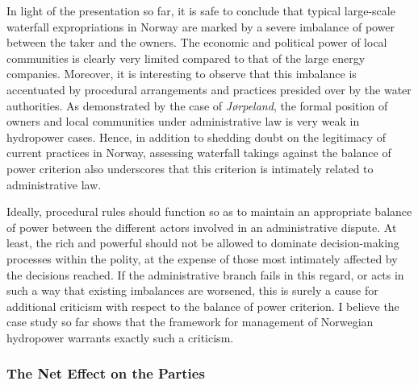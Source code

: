 
In light of the presentation so far, it is safe to conclude that typical large-scale waterfall expropriations in Norway are marked by a severe imbalance of power between the taker and the owners. The economic and political power of local communities is clearly very limited compared to that of the large energy companies. Moreover, it is interesting to observe that this imbalance is accentuated by procedural arrangements and practices presided over by the water authorities. As demonstrated by the case of {\it Jørpeland}, the formal position of owners and local communities under administrative law is very weak in hydropower cases. Hence, in addition to shedding doubt on the legitimacy of current practices in Norway, assessing waterfall takings against the balance of power criterion also underscores that this criterion is intimately related to administrative law.

Ideally, procedural rules should function so as to maintain an appropriate balance of power between the different actors involved in an administrative dispute. At least, the rich and powerful should not be allowed to dominate decision-making processes within the polity, at the expense of those most intimately affected by the decisions reached. If the administrative branch fails in this regard, or acts in such a way that existing imbalances are worsened, this is surely a cause for additional criticism with respect to the balance of power criterion. I believe the case study so far shows that the framework for management of Norwegian hydropower warrants exactly such a criticism.

\subsubsection{The Net Effect on the Parties}


